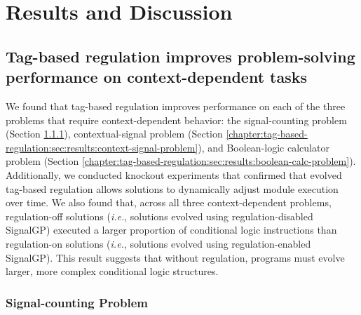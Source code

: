 
\section{Results and Discussion}

\subsection{Tag-based regulation improves problem-solving performance on context-dependent tasks}

We found that tag-based regulation improves performance on each of the three problems that require context-dependent behavior: the signal-counting problem (Section \ref{chapter:tag-based-regulation:sec:results:signal-counting-problem}), contextual-signal problem (Section \ref{chapter:tag-based-regulation:sec:results:context-signal-problem}), and Boolean-logic calculator problem (Section \ref{chapter:tag-based-regulation:sec:results:boolean-calc-problem}). 
Additionally, we conducted knockout experiments that confirmed that evolved tag-based regulation allows solutions to dynamically adjust module execution over time. 
We also found that, across all three context-dependent problems, regulation-off solutions (\textit{i.e.}, solutions evolved using regulation-disabled SignalGP) executed a larger proportion of conditional logic instructions than regulation-on solutions (\textit{i.e.}, solutions evolved using regulation-enabled SignalGP). 
This result suggests that without regulation, programs must evolve larger, more complex conditional logic structures. 

\subsubsection{Signal-counting Problem}
\label{chapter:tag-based-regulation:sec:results:signal-counting-problem}



